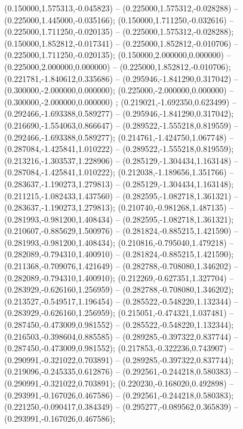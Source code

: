  (0.150000,1.575313,-0.045823) -- (0.225000,1.575312,-0.028288) -- (0.225000,1.445000,-0.035166);
 (0.150000,1.711250,-0.032616) -- (0.225000,1.711250,-0.020135) -- (0.225000,1.575312,-0.028288);
 (0.150000,1.852812,-0.017341) -- (0.225000,1.852812,-0.010706) -- (0.225000,1.711250,-0.020135);
 (0.150000,2.000000,0.000000) -- (0.225000,2.000000,0.000000) -- (0.225000,1.852812,-0.010706);
 (0.221781,-1.840612,0.335686) -- (0.295946,-1.841290,0.317042) -- (0.300000,-2.000000,0.000000);
 (0.225000,-2.000000,0.000000) -- (0.300000,-2.000000,0.000000) ;
 (0.219021,-1.692350,0.623499) -- (0.292466,-1.693388,0.589277) -- (0.295946,-1.841290,0.317042);
 (0.216690,-1.554063,0.866647) -- (0.289522,-1.555218,0.819559) -- (0.292466,-1.693388,0.589277);
 (0.214761,-1.424750,1.067748) -- (0.287084,-1.425841,1.010222) -- (0.289522,-1.555218,0.819559);
 (0.213216,-1.303537,1.228906) -- (0.285129,-1.304434,1.163148) -- (0.287084,-1.425841,1.010222);
 (0.212038,-1.189656,1.351766) -- (0.283637,-1.190273,1.279813) -- (0.285129,-1.304434,1.163148);
 (0.211215,-1.082433,1.437560) -- (0.282595,-1.082718,1.361321) -- (0.283637,-1.190273,1.279813);
 (0.210740,-0.981268,1.487135) -- (0.281993,-0.981200,1.408434) -- (0.282595,-1.082718,1.361321);
 (0.210607,-0.885629,1.500976) -- (0.281824,-0.885215,1.421590) -- (0.281993,-0.981200,1.408434);
 (0.210816,-0.795040,1.479218) -- (0.282089,-0.794310,1.400910) -- (0.281824,-0.885215,1.421590);
 (0.211368,-0.709076,1.421649) -- (0.282788,-0.708080,1.346202) -- (0.282089,-0.794310,1.400910);
 (0.212269,-0.627351,1.327704) -- (0.283929,-0.626160,1.256959) -- (0.282788,-0.708080,1.346202);
 (0.213527,-0.549517,1.196454) -- (0.285522,-0.548220,1.132344) -- (0.283929,-0.626160,1.256959);
 (0.215051,-0.474321,1.037481) -- (0.287450,-0.473009,0.981552) -- (0.285522,-0.548220,1.132344);
 (0.216503,-0.398604,0.885585) -- (0.289285,-0.397322,0.837744) -- (0.287450,-0.473009,0.981552);
 (0.217853,-0.322236,0.743907) -- (0.290991,-0.321022,0.703891) -- (0.289285,-0.397322,0.837744);
 (0.219096,-0.245335,0.612876) -- (0.292561,-0.244218,0.580383) -- (0.290991,-0.321022,0.703891);
 (0.220230,-0.168020,0.492898) -- (0.293991,-0.167026,0.467586) -- (0.292561,-0.244218,0.580383);
 (0.221250,-0.090417,0.384349) -- (0.295277,-0.089562,0.365839) -- (0.293991,-0.167026,0.467586);
